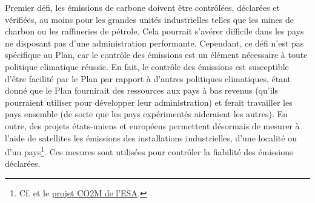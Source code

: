 \documentclass[a5paper,french]{memoir}
\begin{document}
Premier défi, les émissions de carbone doivent être contrôlées, déclarées et vérifiées, au moins pour les grandes unités industrielles telles que les mines de charbon ou les raffineries de pétrole. Cela pourrait s'avérer difficile dans les pays ne disposant pas d'une administration performante. Cependant, ce défi n'est pas spécifique au Plan, car le contrôle des émissions est un élément nécessaire à toute politique climatique réussie. En fait, le contrôle des émissions est susceptible d'être facilité par le Plan par rapport à d'autres politiques climatiques, étant donné que le Plan fournirait des ressources aux pays à bas revenus (qu'ils pourraient utiliser pour développer leur administration) et ferait travailler les pays ensemble (de sorte que les pays expérimentés aideraient les autres). En outre, des projets états-uniens et européens permettent désormais de mesurer à l'aide de satellites les émissions des installations industrielles, d'une localité ou d'un pays\footnote{Cf. \cite{nassar_quantifying_2017,pan_potential_2021,shen_national_2023} et le \href{https://www.esa.int/Applications/Observing_the_Earth/Copernicus/Carbon_dioxide_monitoring_satellite_given_the_shakes}{projet CO2M de l'ESA}.}. Ces mesures sont utilisées pour contrôler la fiabilité des émissions déclarées.
\end{document}
